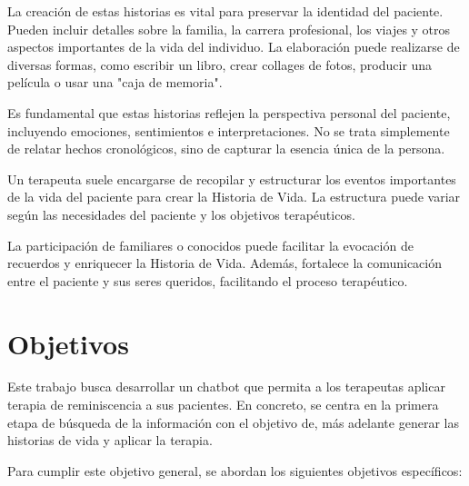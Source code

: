 La creación de estas historias es vital para preservar la identidad del paciente. Pueden incluir detalles sobre la familia, la carrera profesional, los viajes y otros aspectos importantes de la vida del individuo. La elaboración puede realizarse de diversas formas, como escribir un libro, crear collages de fotos, producir una película o usar una "caja de memoria".

Es fundamental que estas historias reflejen la perspectiva personal del paciente, incluyendo emociones, sentimientos e interpretaciones. No se trata simplemente de relatar hechos cronológicos, sino de capturar la esencia única de la persona.

Un terapeuta suele encargarse de recopilar y estructurar los eventos importantes de la vida del paciente para crear la Historia de Vida. La estructura puede variar según las necesidades del paciente y los objetivos terapéuticos.

La participación de familiares o conocidos puede facilitar la evocación de recuerdos y enriquecer la Historia de Vida. Además, fortalece la comunicación entre el paciente y sus seres queridos, facilitando el proceso terapéutico.

\section{Objetivos}
Este trabajo  busca desarrollar un chatbot que permita a los terapeutas aplicar terapia de reminiscencia a sus pacientes. En concreto, se centra en la primera etapa de búsqueda de la información con el objetivo de, más adelante generar las historias de vida y aplicar la terapia. 

Para cumplir este objetivo general, se abordan los siguientes objetivos específicos:

